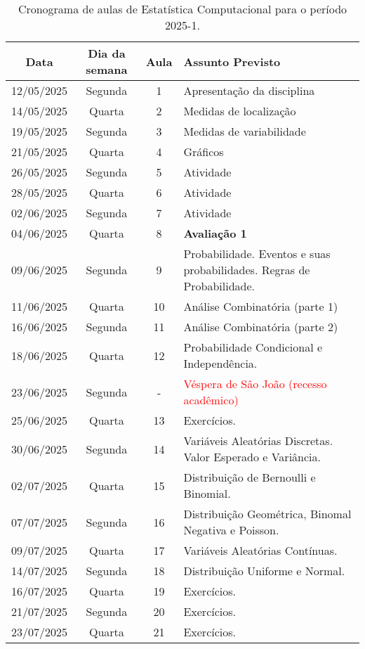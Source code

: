 \documentclass[11pt,a4paper]{report}
\begin{document}
\begin{table}[H]
	\caption{Cronograma de aulas de Estatística Computacional para o período 2025-1.}
	\renewcommand{\arraystretch}{1.15}
	\begin{tabular}{|c|c|c|p{10cm}|}
		\toprule
		\textbf{Data}	&	\textbf{Dia da semana}	&	\textbf{Aula}	&	\textbf{Assunto Previsto}	\\
		\midrule
		12/05/2025 & Segunda & 1 & Apresentação da disciplina \\
		14/05/2025 & Quarta & 2 & Medidas de localização \\
		19/05/2025 & Segunda & 3 & Medidas de variabilidade \\
		21/05/2025 & Quarta & 4 & Gráficos \\
		26/05/2025 & Segunda & 5 & Atividade \\
		28/05/2025 & Quarta & 6 & Atividade \\
		02/06/2025 & Segunda & 7 & Atividade \\
		04/06/2025 & Quarta & 8 & \textbf{Avaliação 1} \\
		09/06/2025 & Segunda & 9 & Probabilidade. Eventos e suas probabilidades. Regras de Probabilidade.\\
		11/06/2025 & Quarta & 10 & Análise Combinatória (parte 1) \\
		16/06/2025 & Segunda & 11 & Análise Combinatória (parte 2) \\
		18/06/2025 & Quarta & 12 & Probabilidade Condicional e Independência. \\
		23/06/2025 & Segunda & - & \textcolor{red}{Véspera de Sâo João (recesso acadêmico)} \\
		25/06/2025 & Quarta & 13 & Exercícios. \\
		30/06/2025 & Segunda & 14 & Variáveis Aleatórias Discretas. Valor Esperado e Variância. \\
		02/07/2025 & Quarta & 15 & Distribuição de Bernoulli e Binomial. \\
		07/07/2025 & Segunda & 16 & Distribuição Geométrica, Binomal Negativa e Poisson. \\
		09/07/2025 & Quarta & 17 & Variáveis Aleatórias Contínuas.\\
		14/07/2025 & Segunda & 18 & Distribuição Uniforme e Normal.\\
		16/07/2025 & Quarta & 19 & Exercícios.\\
		21/07/2025 & Segunda & 20 & Exercícios.\\
		23/07/2025 & Quarta & 21 & Exercícios.\\

\end{tabular}
\end{table}
\end{document}
